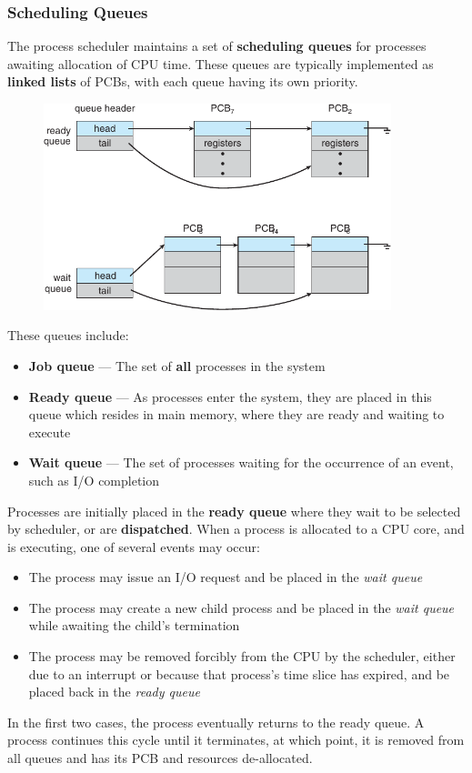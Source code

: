 \documentclass{article}
\begin{document}
\subsubsection{Scheduling Queues}
The process scheduler maintains a set of \textbf{scheduling queues} for
processes awaiting allocation of CPU time. These queues are typically
implemented as \textbf{linked lists} of PCBs, with each queue having
its own priority.
\begin{figure}[H]
    \centering
    \includegraphics[height = 6cm]{figures/scheduler_queues.pdf}
\end{figure}
These queues include:
\begin{itemize}
    \item \textbf{Job queue} --- The set of \textbf{all} processes in the system
    \item \textbf{Ready queue} --- As processes enter the system, they
          are placed in this queue which resides in main memory, where
          they are ready and waiting to execute
    \item \textbf{Wait queue} --- The set of processes waiting for the
          occurrence of an event, such as I/O completion
\end{itemize}
Processes are initially placed in the \textbf{ready queue} where they
wait to be selected by scheduler, or are \textbf{dispatched}.
When a process is allocated to a CPU core, and is executing, one of
several events may occur:
\begin{itemize}
    \item The process may issue an I/O request and be placed in the
          \textit{wait queue}
    \item The process may create a new child process and be placed in
          the \textit{wait queue} while awaiting the child's
          termination
    \item The process may be removed forcibly from the CPU by the
          scheduler, either due to an interrupt or because that
          process's time slice has expired, and be placed back in the
          \textit{ready queue}
\end{itemize}
In the first two cases, the process eventually returns to the ready queue.
A process continues this cycle until it terminates, at which point, it
is removed from all queues and has its PCB and resources de-allocated.
\end{document}
